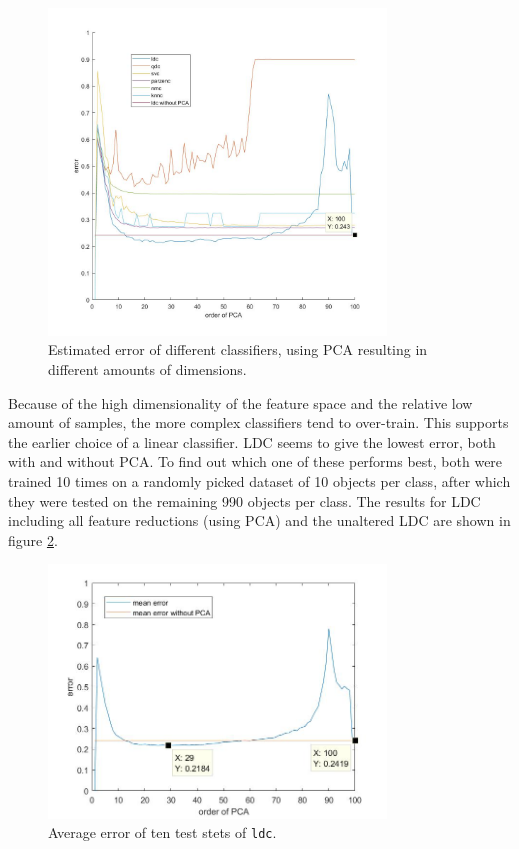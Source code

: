 \begin{figure}[H]
	\centering
	\includegraphics[width = 0.8\textwidth]{images/dissim_all_class.jpg}
	\caption{Estimated error of different classifiers, using PCA resulting in different amounts of dimensions.}
	\label{fig:dissim_all_class}
\end{figure}
\noindent Because of the high dimensionality of the feature space and the relative low amount of samples, the more complex classifiers tend to over-train. This supports the earlier choice of a linear classifier. LDC seems to give the lowest error, both with and without PCA. To find out which one of these performs best, both were trained 10 times on a randomly picked dataset of 10 objects per class, after which they were tested on the remaining 990 objects per class. The results for LDC including all feature reductions (using PCA) and the unaltered LDC are shown in figure \ref{fig:dissim_ldc_mean}.
\begin{figure}[H]
	\centering
	\includegraphics[width = 0.8\textwidth]{images/dissim_ldc_mean.jpg}
	\caption{Average error of ten test stets of \texttt{ldc}.}
	\label{fig:dissim_ldc_mean}
\end{figure}
